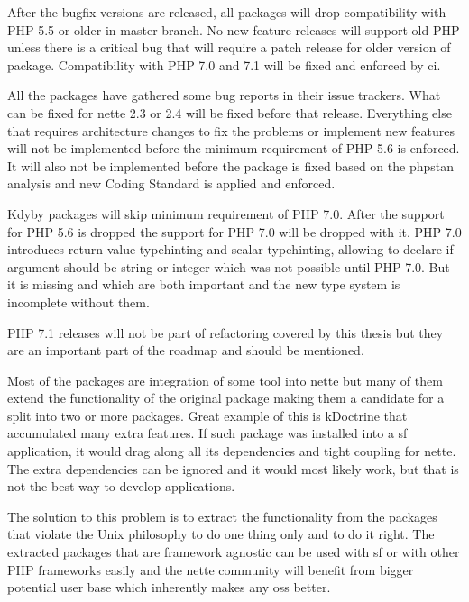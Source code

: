 After the bugfix versions are released, all packages will drop compatibility with PHP 5.5 or older in master branch. No new feature releases will support old PHP unless there is a critical bug that will require a patch release for older version of package. Compatibility with PHP 7.0 and 7.1 will be fixed and enforced by \gls{ci}.

All the packages have gathered some bug reports in their issue trackers. What can be fixed for \gls{nette} 2.3 or 2.4 will be fixed before that release. Everything else that requires architecture changes to fix the problems or implement new features will not be implemented before the minimum requirement of PHP 5.6 is enforced. It will also not be implemented before the package is fixed based on the \gls{phpstan} analysis and new Coding Standard is applied and enforced.


Kdyby packages will skip minimum requirement of PHP 7.0. After the support for PHP 5.6 is dropped the support for PHP 7.0 will be dropped with it. PHP 7.0 introduces return value typehinting and scalar typehinting, allowing to declare if argument should be string or integer which was not possible until PHP 7.0. But it is missing  and  which are both important and the new type system is incomplete without them.

PHP 7.1 releases will not be part of refactoring covered by this thesis but they are an important part of the roadmap and should be mentioned.


Most of the packages are integration of some tool into \gls{nette} but many of them extend the functionality of the original package making them a candidate for a split into two or more packages. Great example of this is \gls{kDoctrine} that accumulated many extra features. If such package was installed into a \gls{sf} application, it would drag along all its dependencies and tight coupling for \gls{nette}. The extra dependencies can be ignored and it would most likely work, but that is not the best way to develop applications.

The solution to this problem is to extract the functionality from the packages that violate the Unix philosophy to do one thing only and to do it right. The extracted packages that are framework agnostic can be used with \gls{sf} or with other PHP frameworks easily and the \gls{nette} community will benefit from bigger potential user base which inherently makes any \gls{oss} better.

